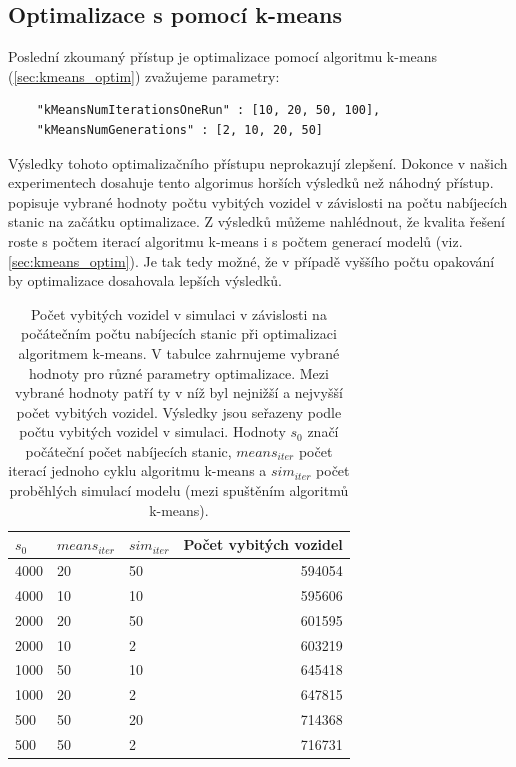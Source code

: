 \subsection{Optimalizace s pomocí k-means}

Poslední zkoumaný přístup je optimalizace pomocí algoritmu k-means 
(\cref{sec:kmeans_optim}) zvažujeme parametry:

\begin{verbatim}
    "kMeansNumIterationsOneRun" : [10, 20, 50, 100],
    "kMeansNumGenerations" : [2, 10, 20, 50]
\end{verbatim}

Výsledky tohoto optimalizačního přístupu neprokazují zlepšení. Dokonce v našich
experimentech dosahuje tento algorimus horších výsledků než náhodný přístup.
 popisuje vybrané hodnoty počtu
vybitých vozidel v závislosti na počtu nabíjecích stanic na začátku optimalizace.
Z výsledků můžeme nahlédnout, že kvalita řešení roste s počtem iterací
algoritmu k-means i s počtem generací modelů (viz. \cref{sec:kmeans_optim}).
Je tak tedy možné, že v případě vyššího počtu opakování by optimalizace dosahovala
lepších výsledků.


\begin{table}
\centering\footnotesize\sf
\begin{tabular}{lllr}
\toprule
$s_0$ & $means_{iter}$ & $sim_{iter}$ & Počet vybitých vozidel\\
\midrule
4000 & 20 & 50 & 594054 \\
4000 & 10 & 10 & 595606 \\
2000 & 20 & 50 & 601595 \\
2000 & 10 & 2 & 603219 \\
1000 & 50 & 10 & 645418 \\
1000 & 20 & 2 & 647815 \\
500 & 50 & 20 & 714368 \\
500 & 50 & 2 & 716731 \\
\bottomrule
\end{tabular}
\caption{Počet vybitých vozidel v simulaci v závislosti na počátečním počtu 
nabíjecích stanic při optimalizaci algoritmem k-means. V tabulce zahrnujeme 
vybrané hodnoty pro různé parametry optimalizace. Mezi vybrané 
hodnoty patří ty v níž byl nejnižší a nejvyšší počet vybitých vozidel.
Výsledky jsou seřazeny podle počtu vybitých vozidel v simulaci. Hodnoty $s_0$ značí
počáteční počet nabíjecích stanic, $means_{iter}$ počet iterací jednoho cyklu algoritmu
k-means a $sim_{iter}$ počet proběhlých simulací modelu (mezi spuštěním algoritmů k-means). }
\label{tab:vysledky_kmeans}
\end{table}


